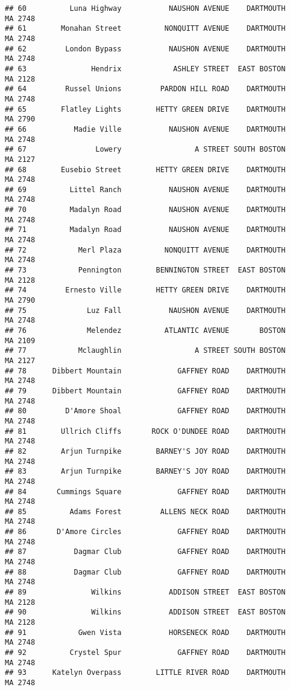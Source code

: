 \documentclass[
]{article}
\begin{document}
\begin{verbatim}
## 60          Luna Highway           NAUSHON AVENUE    DARTMOUTH    MA 2748
## 61        Monahan Street          NONQUITT AVENUE    DARTMOUTH    MA 2748
## 62         London Bypass           NAUSHON AVENUE    DARTMOUTH    MA 2748
## 63               Hendrix            ASHLEY STREET  EAST BOSTON    MA 2128
## 64         Russel Unions         PARDON HILL ROAD    DARTMOUTH    MA 2748
## 65        Flatley Lights        HETTY GREEN DRIVE    DARTMOUTH    MA 2790
## 66           Madie Ville           NAUSHON AVENUE    DARTMOUTH    MA 2748
## 67                Lowery                 A STREET SOUTH BOSTON    MA 2127
## 68        Eusebio Street        HETTY GREEN DRIVE    DARTMOUTH    MA 2748
## 69          Littel Ranch           NAUSHON AVENUE    DARTMOUTH    MA 2748
## 70          Madalyn Road           NAUSHON AVENUE    DARTMOUTH    MA 2748
## 71          Madalyn Road           NAUSHON AVENUE    DARTMOUTH    MA 2748
## 72            Merl Plaza          NONQUITT AVENUE    DARTMOUTH    MA 2748
## 73            Pennington        BENNINGTON STREET  EAST BOSTON    MA 2128
## 74         Ernesto Ville        HETTY GREEN DRIVE    DARTMOUTH    MA 2790
## 75              Luz Fall           NAUSHON AVENUE    DARTMOUTH    MA 2748
## 76              Melendez          ATLANTIC AVENUE       BOSTON    MA 2109
## 77            Mclaughlin                 A STREET SOUTH BOSTON    MA 2127
## 78      Dibbert Mountain             GAFFNEY ROAD    DARTMOUTH    MA 2748
## 79      Dibbert Mountain             GAFFNEY ROAD    DARTMOUTH    MA 2748
## 80         D'Amore Shoal             GAFFNEY ROAD    DARTMOUTH    MA 2748
## 81        Ullrich Cliffs       ROCK O'DUNDEE ROAD    DARTMOUTH    MA 2748
## 82        Arjun Turnpike        BARNEY'S JOY ROAD    DARTMOUTH    MA 2748
## 83        Arjun Turnpike        BARNEY'S JOY ROAD    DARTMOUTH    MA 2748
## 84       Cummings Square             GAFFNEY ROAD    DARTMOUTH    MA 2748
## 85          Adams Forest         ALLENS NECK ROAD    DARTMOUTH    MA 2748
## 86       D'Amore Circles             GAFFNEY ROAD    DARTMOUTH    MA 2748
## 87           Dagmar Club             GAFFNEY ROAD    DARTMOUTH    MA 2748
## 88           Dagmar Club             GAFFNEY ROAD    DARTMOUTH    MA 2748
## 89               Wilkins           ADDISON STREET  EAST BOSTON    MA 2128
## 90               Wilkins           ADDISON STREET  EAST BOSTON    MA 2128
## 91            Gwen Vista           HORSENECK ROAD    DARTMOUTH    MA 2748
## 92          Crystel Spur             GAFFNEY ROAD    DARTMOUTH    MA 2748
## 93      Katelyn Overpass        LITTLE RIVER ROAD    DARTMOUTH    MA 2748

\end{verbatim}
\end{document}
